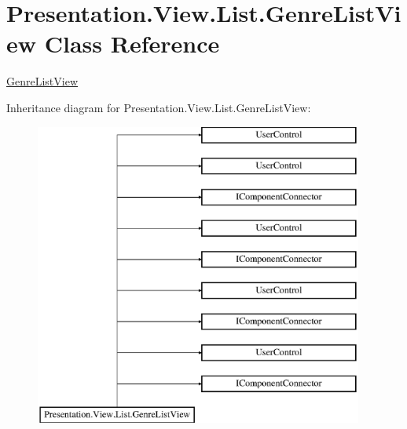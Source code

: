 \hypertarget{class_presentation_1_1_view_1_1_list_1_1_genre_list_view}{}\section{Presentation.\+View.\+List.\+Genre\+List\+View Class Reference}
\label{class_presentation_1_1_view_1_1_list_1_1_genre_list_view}


\hyperlink{class_presentation_1_1_view_1_1_list_1_1_genre_list_view}{Genre\+List\+View}  


Inheritance diagram for Presentation.\+View.\+List.\+Genre\+List\+View\+:\begin{figure}[H]
\begin{center}
\leavevmode
\includegraphics[height=10.000000cm]{class_presentation_1_1_view_1_1_list_1_1_genre_list_view}
\end{center}
\end{figure}

